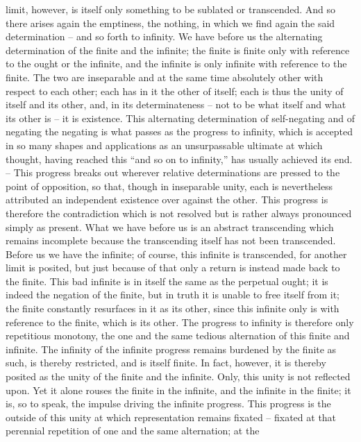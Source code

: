 limit, however, is itself only something to be sublated or transcended. And
so there arises again the emptiness, the nothing, in which we find again the
said determination – and so forth to infinity.
We have before us the alternating determination of the finite and the
infinite; the finite is finite only with reference to the ought or the infinite,
and the infinite is only infinite with reference to the finite. The two are
inseparable and at the same time absolutely other with respect to each
other; each has in it the other of itself; each is thus the unity of itself and
its other, and, in its determinateness – not to be what itself and what its
other is – it is existence.
This alternating determination of self-negating and of negating the
negating is what passes as the progress to infinity, which is accepted in
so many shapes and applications as an unsurpassable ultimate at which
thought, having reached this “and so on to infinity,” has usually achieved
its end. – This progress breaks out wherever relative determinations are
pressed to the point of opposition, so that, though in inseparable unity,
each is nevertheless attributed an independent existence over against the
other. This progress is therefore the contradiction which is not resolved but
is rather always pronounced simply as present.
What we have before us is an abstract transcending which remains
incomplete because the transcending itself has not been transcended. Before
us we have the infinite; of course, this infinite is transcended, for another
limit is posited, but just because of that only a return is instead made back
to the finite. This bad infinite is in itself the same as the perpetual ought;
it is indeed the negation of the finite, but in truth it is unable to free
itself from it; the finite constantly resurfaces in it as its other, since this
infinite only is with reference to the finite, which is its other. The progress
to infinity is therefore only repetitious monotony, the one and the same
tedious alternation of this finite and infinite.
The infinity of the infinite progress remains burdened by the finite as
such, is thereby restricted, and is itself finite. In fact, however, it is thereby
posited as the unity of the finite and the infinite. Only, this unity is not
reflected upon. Yet it alone rouses the finite in the infinite, and the infinite
in the finite; it is, so to speak, the impulse driving the infinite progress. This
progress is the outside of this unity at which representation remains fixated –
fixated at that perennial repetition of one and the same alternation; at the
